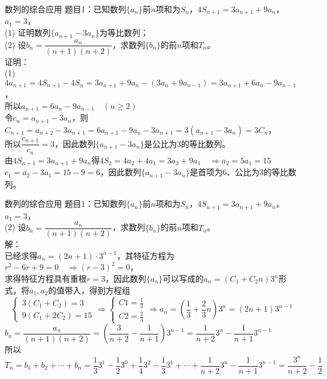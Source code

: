 \documentclass[aspectratio=169]{ctexbeamer} %
\date{\today}
\begin{document}
\begin{frame}[t]{数列的综合应用}
题目1：已知数列$\{  a_n \}$前$n$项和为$S_n$，$4S_{n+1} = 3a_{n+1} + 9a_n$，$a_1 = 3$， \\
(1) 证明数列$\{  a_{n+1} - 3a_n \}$为等比数列；\\
(2) 设$b_n = \dfrac{a_n}{(n+1)(n+2)}$，求数列$\{  b_n \}$的前$n$项和$T_n$。\\
\pause
证明：\\
(1) $4a_{n+1} = 4S_{n+1} - 4S_n = 3a_{n+1} + 9a_n - (3a_{n} + 9a_{n-1}) =  3a_{n+1} + 6a_n - 9a_{n-1}$，\\
\pause
所以$a_{n+1} = 6a_n - 9a_{n-1} \quad (n \geq 2)$ \\
\pause
令$c_n = a_{n+1} - 3a_n $，则$C_{n+1} = a_{n+2} - 3a_{n+1} = 6a_{n+1} - 9a_{n} - 3a_{n+1} = 3(a_{n+1} - 3a_{n}) = 3C_n$，\\
所以$\dfrac{c_{n+1}}{c_n} = 3$，因此数列$\{  a_{n+1} - 3a_n \}$是公比为3的等比数列。\\
\pause
由$4S_{n+1} = 3a_{n+1} + 9a_n$得$4S_2 = 4a_2 + 4a_1 = 3a_2 + 9a_1 \quad \Rightarrow a_2 = 5a_1 = 15$ \\
\pause
$c_1 = a_2 - 3a_1 = 15 - 9 = 6$，因此数列$\{  a_{n+1} - 3a_n \}$是首项为6、公比为3的等比数列。
\end{frame}

\begin{frame}[t]{数列的综合应用}
题目1：已知数列$\{  a_n \}$前$n$项和为$S_n$，$4S_{n+1} = 3a_{n+1} + 9a_n$，$a_1 = 3$， \\
(2) 设$b_n = \dfrac{a_n}{(n+1)(n+2)}$，求数列$\{  b_n \}$的前$n$项和$T_n$。\\
\pause
解：\\ 
已经求得$a_n = (2n + 1) \cdot 3^{n-1}$，其特征方程为$r^2 - 6r + 9 = 0 \quad \Rightarrow (r - 3)^2 = 0$，\\
\pause
求得特征方程具有重根$r = 3$，因此数列$\{ a_n \}$可以写成的$a_n = (C_1 + C_2 n)3^n$形式，将$a_1, a_2$的值带入，得到方程组\\
\pause
\[
\begin{cases}
3(C_1 + C_2) = 3 \\
9(C_1 + 2C_2) = 15
\end{cases}
\Rightarrow 
\begin{cases}
C1 = \frac{1}{3}\\
C2 = \frac{2}{3}
\end{cases}
\Rightarrow a_n = (\dfrac{1}{3} + \dfrac{2}{3}n)3^n = (2n+1)3^{n-1}
\]
\pause
$b_n = \dfrac{a_n}{(n+1)(n+2)} = \left (\dfrac{3}{n+2} - \dfrac{1}{n+1} \right ) 3^{n-1} = \dfrac{1}{n+2}3^n - \dfrac{1}{n+1} 3^{n-1}$ \\
\pause
所以$T_n = b_1 + b_2 + \cdots + b_n = \dfrac{1}{3}3^1 - \dfrac{1}{2}3^0 + \dfrac{1}{4}3^2 - \dfrac{1}{3}3^1 + \cdots + \dfrac{1}{n+2}3^n - \dfrac{1}{n+1}3^{n-1} = \dfrac{3^n}{n+2} - \dfrac{1}{2}$
\end{frame}
\end{document}
